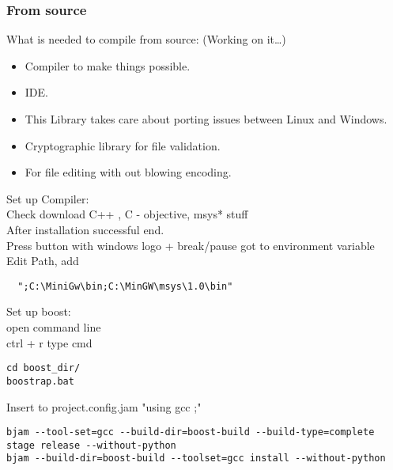 \subsubsection{From source}
What is needed to compile from source: (Working on it\ldots)
\begin{itemize}
\item [ \href{http://sourceforge.net/projects/mingw/files/Automated\%20MinGW\%20Installer/mingw-get-inst/mingw-get-inst-20100909/mingw-get-inst-20100909.exe/download/}{\textbf{MiniGw gcc}} ] Compiler to make things possible.
\item [ \href{http://www.codeblocks.org/}{\textbf{CodeBlocks}} ] IDE.
\item [ \href{http://sourceforge.net/projects/boost/files/boost/1.41.0/boost_1_41_0.7z/download}{\textbf{Boost library}} ] This Library takes care about porting issues between Linux and Windows.
\item [ \href{http://www.cryptopp.com/}{\textbf{Crypto++}} ] Cryptographic library for file validation.
\item [ \href{http://notepad-plus-plus.org/}{\textbf{Notpad++}} ] For file editing with out blowing encoding.
\end{itemize}
Set up Compiler:\\
Check download C++ , C - objective, msys* stuff \\
After installation successful end.\\
Press button with windows logo + break/pause got to environment variable\\
Edit Path, add \begin{verbatim}  ";C:\MiniGw\bin;C:\MinGW\msys\1.0\bin" 
\end{verbatim}

Set up boost:\\
open command line\\
ctrl + r type cmd
\begin{verbatim} 
cd boost_dir/
boostrap.bat
\end{verbatim}
Insert to project.config.jam "using gcc ;"
\begin{verbatim} 
bjam --tool-set=gcc --build-dir=boost-build --build-type=complete stage release --without-python
bjam --build-dir=boost-build --toolset=gcc install --without-python
\end{verbatim}

